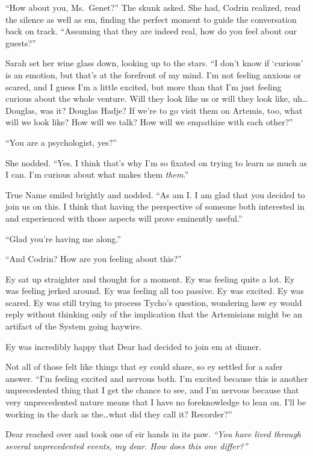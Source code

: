 ``How about you, Ms.~Genet?'' The skunk asked. She had, Codrin realized, read the silence as well as em, finding the perfect moment to guide the conversation back on track. ``Assuming that they are indeed real, how do you feel about our guests?''

Sarah set her wine glass down, looking up to the stars. ``I don't know if `curious' is an emotion, but that's at the forefront of my mind. I'm not feeling anxious or scared, and I guess I'm a little excited, but more than that I'm just feeling curious about the whole venture. Will they look like us or will they look like, uh\ldots Douglas, was it? Douglas Hadje? If we're to go visit them on Artemis, too, what will we look like? How will we talk? How will we empathize with each other?''

``You are a psychologist, yes?''

She nodded. ``Yes. I think that's why I'm so fixated on trying to learn as much as I can. I'm curious about what makes them \emph{them}.''

True Name smiled brightly and nodded. ``As am I. I am glad that you decided to join us on this. I think that having the perspective of someone both interested in and experienced with those aspects will prove eminently useful.''

``Glad you're having me along.''

``And Codrin? How are you feeling about this?''

Ey sat up straighter and thought for a moment. Ey was feeling quite a lot. Ey was feeling jerked around. Ey was feeling all too passive. Ey was excited. Ey was scared. Ey was still trying to process Tycho's question, wondering how ey would reply without thinking only of the implication that the Artemisians might be an artifact of the System going haywire.

Ey was incredibly happy that Dear had decided to join em at dinner.

Not all of those felt like things that ey could share, so ey settled for a safer answer. ``I'm feeling excited and nervous both. I'm excited because this is another unprecedented thing that I get the chance to see, and I'm nervous because that very unprecedented nature means that I have no foreknowledge to lean on. I'll be working in the dark as the\ldots what did they call it? Recorder?''

Dear reached over and took one of eir hands in its paw. \emph{``You have lived through several unprecedented events, my dear. How does this one differ?''}

